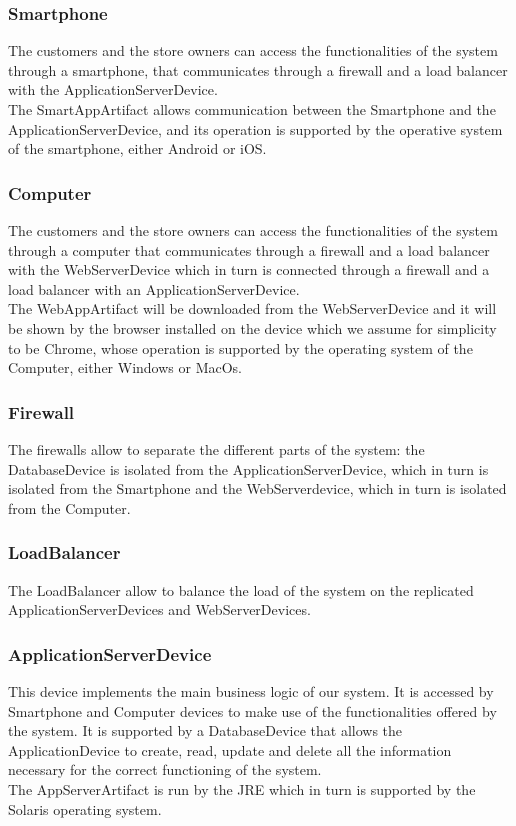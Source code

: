 \subsubsection{Smartphone}
The customers and the store owners can access the functionalities of the system through a smartphone, that communicates through a firewall and a load balancer with the ApplicationServerDevice.\\
The SmartAppArtifact allows communication between the Smartphone and the ApplicationServerDevice, and its operation is supported by the operative system of the smartphone, either Android or iOS.
\subsubsection{Computer}
The customers and the store owners can access the functionalities of the system through a computer that communicates through a firewall and a load balancer with the WebServerDevice which in turn is connected through a firewall and a load balancer with an ApplicationServerDevice.\\
The WebAppArtifact will be downloaded from the WebServerDevice and it will be shown by the browser installed on the device which we assume for simplicity to be Chrome, whose operation is supported by the operating system of the Computer, either Windows or MacOs. 
\subsubsection{Firewall}
The firewalls allow to separate the different parts of the system: the DatabaseDevice is isolated from the ApplicationServerDevice, which in turn is isolated from the Smartphone and the WebServerdevice, which in turn is isolated from the Computer.
\subsubsection{LoadBalancer}
The LoadBalancer allow to balance the load of the system on the replicated ApplicationServerDevices and WebServerDevices.
\subsubsection{ApplicationServerDevice}
This device implements the main business logic of our system. It is accessed by Smartphone and Computer devices to make use of the functionalities offered by the system. It is supported by a DatabaseDevice that allows the ApplicationDevice to create, read, update and delete all the information necessary for the correct functioning of the system.\\
The AppServerArtifact is run by the JRE which in turn is supported by the Solaris operating system.
